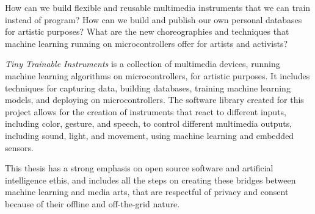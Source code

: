 % 
%
%
How can we build flexible and reusable multimedia instruments that we can train instead of program? How can we build and publish our own personal databases for artistic purposes? What are the new choreographies and techniques that machine learning running on microcontrollers offer for artists and activists?

 \emph{Tiny Trainable Instruments} is a collection of multimedia devices, running machine learning algorithms on microcontrollers, for artistic purposes. It includes techniques for capturing data, building databases, training machine learning models, and deploying on microcontrollers. The software library created for this project allows for the creation of instruments that react to different inputs, including color, gesture, and speech, to control different multimedia outputs, including sound, light, and movement, using machine learning and embedded sensors.

This thesis has a strong emphasis on open source software and artificial intelligence ethis, and includes all the steps on creating these bridges between machine learning and media arts, that are respectful of privacy and consent because of their offline and off-the-grid nature.
